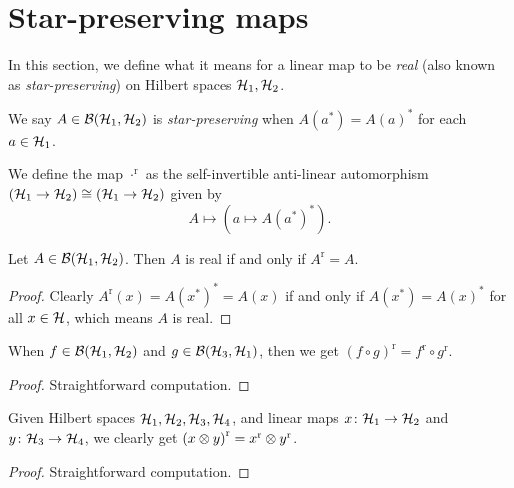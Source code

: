 \chapter{Star-preserving maps}
 In this section, we define what it means for a linear map to be \textit{real} (also known as \textit{star-preserving}) on Hilbert spaces $\mathcal{H}_1,\mathcal{H}_2$.
 
 \begin{definition}\label{LinearMap.IsReal}\leanok
  We say $A\in\mathcal{B}(\mathcal{H}_1,\mathcal{H}_2)$ is \textit{star-preserving} when $A(a^*)={A(a)}^*$ for each $a\in\mathcal{H}_1$.
 \end{definition}
 
 \begin{definition}\label{LinearMap.real}\leanok
  We define the map $\cdot^{\operatorname{r}}$ as the self-invertible anti-linear automorphism $(\mathcal{H}_1\to\mathcal{H}_2)\cong(\mathcal{H}_1\to\mathcal{H}_2)$ given by
  \[A\mapsto(a\mapsto{A(a^*)}^*).\]
 \end{definition}

 \begin{lemma}\label{LinearMap.isReal_iff}\leanok
  Let $A\in\mathcal{B}(\mathcal{H}_1,\mathcal{H}_2)$. Then $A$ is real if and only if $A^{\operatorname{r}}=A$.
 \end{lemma}
 \begin{proof}\leanok
  Clearly $A^{\operatorname{r}}(x)={A(x^*)}^*=A(x)$ if and only if $A(x^*)={A(x)}^*$ for all $x\in\mathcal{H}$, which means $A$ is real.
 \end{proof}

 \begin{lemma}\label{LinearMap.real_comp}\leanok
  When $f\in\mathcal{B}(\mathcal{H}_1,\mathcal{H}_2)$ and $g\in\mathcal{B}(\mathcal{H}_3,\mathcal{H}_1)$, then we get ${(f\circ g)}^{\operatorname{r}}={f^{\operatorname{r}}}\circ{{g^{\operatorname{r}}}}$.
 \end{lemma}
 \begin{proof}\leanok
  Straightforward computation.
 \end{proof}

 \begin{lemma}\label{TensorProduct.map_real}\leanok
  Given Hilbert spaces $\mathcal{H}_1,\mathcal{H}_2,\mathcal{H}_3,\mathcal{H}_4$, and linear maps $x\colon\mathcal{H}_1\to\mathcal{H}_2$ and $y\colon\mathcal{H}_3\to\mathcal{H}_4$, we clearly get ${(x\otimes y)}^{\operatorname{r}}={x}^{\operatorname{r}}\otimes{y}^{\operatorname{r}}$.
 \end{lemma}
 \begin{proof}\leanok
  Straightforward computation.
 \end{proof}

